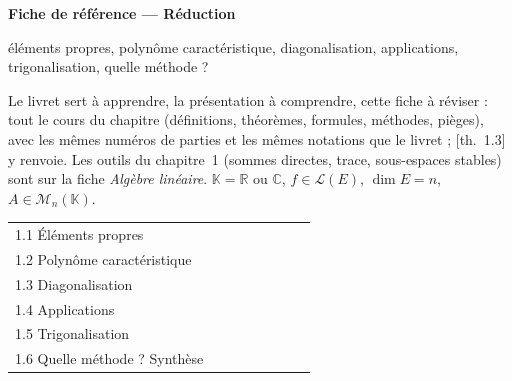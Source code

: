 \documentclass[a4paper,10pt]{article}
\newcommand{\K}{\mathbb{K}}\newcommand{\R}{\mathbb{R}}\newcommand{\C}{\mathbb{C}}\newcommand{\Z}{\mathbb{Z}}
\newcommand{\Mn}[1]{\mathcal{M}_{n}(#1)}\newcommand{\rg}{\operatorname{rg}}\newcommand{\vect}{\operatorname{Vect}}
\newcommand{\livre}[1]{{\sffamily\scriptsize\color{Gris}[#1]}}
\begin{document}
\thispagestyle{empty}
\noindent\colorbox{Bleu}{\parbox{\dimexpr\linewidth-2\fboxsep}{\vspace{0.4em}
{\color{white}\sffamily\scriptsize{}}\par\smallskip
{\color{white}\sffamily\bfseries\LARGE Fiche de référence --- Réduction}\par\smallskip
{\color{white!85!Bleu}\sffamily éléments propres, polynôme caractéristique, diagonalisation, applications, trigonalisation, quelle méthode ?}\vspace{0.4em}}}

\vspace{0.6em}
{\small Le livret sert à apprendre, la présentation à comprendre, cette fiche à réviser : tout le cours du chapitre (définitions, théorèmes, formules, méthodes, pièges), avec les mêmes numéros de parties et les mêmes notations que le livret ; \livre{th.~1.3} y renvoie. Les outils du chapitre~1 (sommes directes, trace, sous-espaces stables) sont sur la fiche \emph{Algèbre linéaire}. $\K=\R$ ou $\C$, $f\in\mathcal L(E)$, $\dim E=n$, $A\in\Mn{\K}$.}

\vspace{0.4em}
{\small\sffamily\noindent\begin{tabular}{@{}p{0.6\linewidth}@{}}
1.1 Éléments propres \dotfill\pageref{n11}\\
1.2 Polynôme caractéristique \dotfill\pageref{n12}\\
1.3 Diagonalisation \dotfill\pageref{n13}\\
1.4 Applications \dotfill\pageref{n14}\\
1.5 Trigonalisation \dotfill\pageref{n15}\\
1.6 Quelle méthode ? Synthèse \dotfill\pageref{n16}\\
\end{tabular}}
\end{document}
